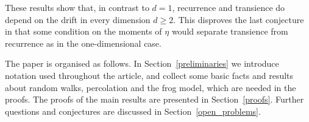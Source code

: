 These results show that, in contrast to $d=1$, recurrence and transience do depend on the drift in every dimension $d \geq 2$. This disproves the last conjecture in \cite{GS09} that some condition on the moments of $\eta$ would separate transience from recurrence as in the one-dimensional case.

The paper is organised as follows. In Section~\ref{preliminaries} we introduce notation used throughout the article, and collect some basic facts and results about random walks, percolation and the frog model, which are needed in the proofs. The proofs of the main results are presented in Section~\ref{proofs}. Further questions and conjectures are discussed in Section~\ref{open_problems}.









